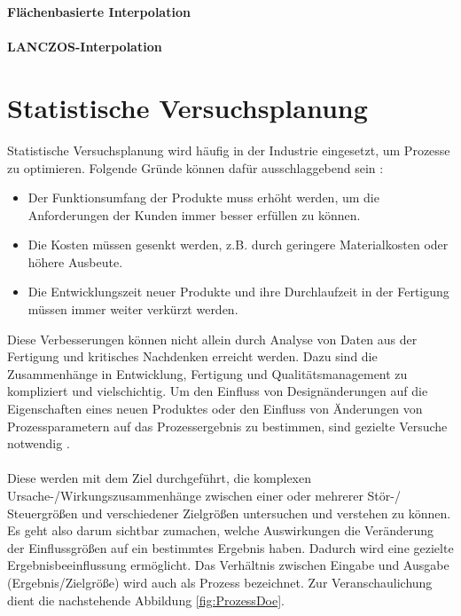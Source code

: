 \documentclass[
fontsize=10pt, 
listof = totoc,
parskip = half	
]{report}
\begin{document}
%		
%

\noindent\textbf{Flächenbasierte Interpolation}
\\\\
\noindent\textbf{LANCZOS-Interpolation}


\section{Statistische Versuchsplanung}
\label{sec:StatVersPlanung}
Statistische Versuchsplanung wird häufig in der Industrie eingesetzt, um Prozesse zu optimieren. Folgende Gründe können dafür ausschlaggebend sein \cite{kleppmann_2020}:

\begin{itemize}
	\item Der Funktionsumfang der Produkte muss erhöht werden, um die Anforderungen der Kunden immer besser erfüllen zu können.
	\item Die Kosten müssen gesenkt werden, z.B. durch geringere Materialkosten oder höhere
	Ausbeute.
	\item Die Entwicklungszeit neuer Produkte und ihre Durchlaufzeit in der Fertigung müssen
	immer weiter verkürzt werden.
\end{itemize}

\noindent Diese Verbesserungen können nicht allein durch Analyse von Daten aus der Fertigung und kritisches Nachdenken erreicht werden. Dazu sind die Zusammenhänge in Entwicklung, Fertigung und Qualitätsmanagement zu kompliziert und vielschichtig. Um den Einfluss von Designänderungen auf die Eigenschaften eines neuen Produktes oder den Einfluss von Änderungen von Prozessparametern auf das Prozessergebnis zu bestimmen,
sind gezielte Versuche notwendig \cite{kleppmann_2020}.
\\\\
\noindent Diese werden mit dem Ziel durchgeführt, die komplexen Ursache-/Wirkungszusammenhänge zwischen einer oder mehrerer Stör-/ Steuergrößen und verschiedener Zielgrößen untersuchen und verstehen zu können. Es geht also darum sichtbar zumachen, welche Auswirkungen die Veränderung der Einflussgrößen auf ein bestimmtes Ergebnis haben. Dadurch wird eine gezielte Ergebnisbeeinflussung ermöglicht. Das Verhältnis zwischen Eingabe und Ausgabe (Ergebnis/Zielgröße) wird auch als Prozess bezeichnet. Zur Veranschaulichung dient die nachstehende Abbildung \ref{fig:ProzessDoe}.
\end{document}
